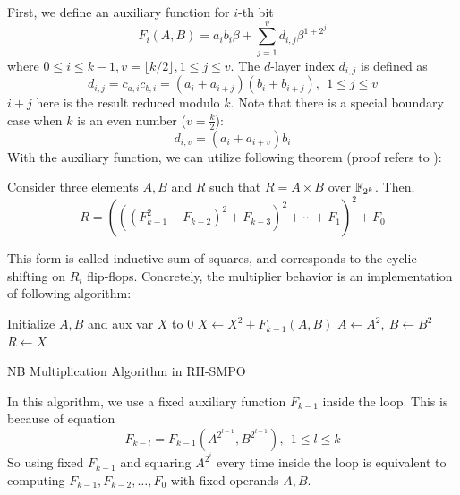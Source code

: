 \begin{Proof}
First, we define an auxiliary function for $i$-th bit 
\begin{equation}
\label{eqn:aux}
F_i(A,B) = a_ib_i\beta + \sum_{j=1}^v d_{i,j}\beta^{1+2^j}
\end{equation}
where $0\leq i\leq k-1, v = \lfloor k/2\rfloor, 1\leq j \leq v$.
The $d$-layer index $d_{i,j}$ is defined as
\begin{equation}
\label{eqn:auxDC}
d_{i,j} = c_{a,i} c_{b,i} = (a_i+a_{i+j})(b_i+b_{i+j}),~~1\leq j\leq v
\end{equation}
$i+j$ here is the result reduced modulo $k$. Note that there is a special boundary case when
$k$ is an even number ($v = \frac{k}{2}$):
$$d_{i,v} = (a_i+a_{i+v})b_i$$
With the auxiliary function, we can utilize following theorem (proof refers to \cite{RHmulti}):
\begin{Theorem}
Consider three elements $A,B$ and $R$ such that $R=A\times B$ over ${\mathbb{F}}_{2^k}$. Then,
$$R=(((F_{k-1}^2+F_{k-2})^2+F_{k-3})^2+\cdots+F_1)^2+F_0$$
\end{Theorem}
This form is called inductive sum of squares, and corresponds to the cyclic shifting on 
$R_i$ flip-flops. Concretely, the multiplier behavior is an implementation of 
following algorithm:

\begin{algorithm}[H]
\SetAlgoNoLine

  Initialize $A,B$ and aux var $X$ to 0\;
  {
	$X \gets X^2+F_{k-1}(A,B)$ 
	$A\gets A^2,~B\gets B^2$ 
  }
  $R\gets X$
\caption{NB Multiplication Algorithm in RH-SMPO \cite{RHmulti}}\label{alg:RHmulti}
\end{algorithm}

In this algorithm, we use a fixed auxiliary function $F_{k-1}$ inside the loop.
This is because of equation
$$F_{k-l} = F_{k-1}(A^{2^{l-1}},B^{2^{l-1}}),~~1\le l\le k$$
So using fixed $F_{k-1}$ and squaring $A^{2^i}$ every time inside the loop is equivalent to computing 
$F_{k-1},F_{k-2},\dots,F_0$ with fixed operands $A,B$.
\end{Proof}

